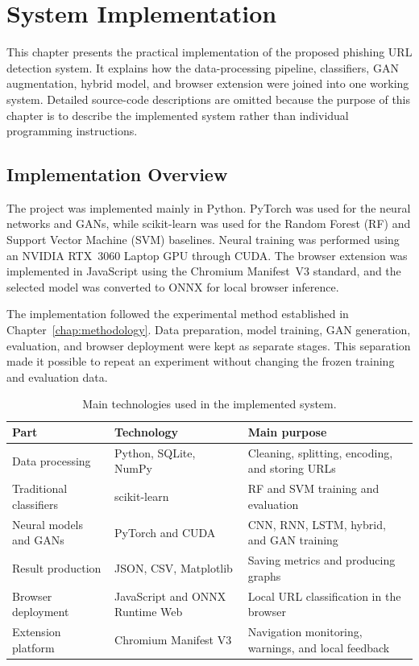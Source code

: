 \chapter{System Implementation}
\label{chap:implementation}

This chapter presents the practical implementation of the proposed phishing
URL detection system. It explains how the data-processing pipeline,
classifiers, GAN augmentation, hybrid model, and browser extension were joined
into one working system. Detailed source-code descriptions are omitted because
the purpose of this chapter is to describe the implemented system rather than
individual programming instructions.

\section{Implementation Overview}

The project was implemented mainly in Python. PyTorch was used for the neural
networks and GANs, while scikit-learn was used for the Random Forest (RF) and
Support Vector Machine (SVM) baselines. Neural training was performed using an
NVIDIA RTX~3060 Laptop GPU through CUDA. The browser extension was implemented
in JavaScript using the Chromium Manifest~V3 standard, and the selected model
was converted to ONNX for local browser inference.

The implementation followed the experimental method established in
Chapter~\ref{chap:methodology}. Data preparation, model training, GAN
generation, evaluation, and browser deployment were kept as separate stages.
This separation made it possible to repeat an experiment without changing the
frozen training and evaluation data.

\begin{table}[htbp]
\centering
\caption{Main technologies used in the implemented system.}
\label{tab:implementation-software}
\small
\begin{tabular}{@{}p{}p{}p{}@{}}
\toprule
Part & Technology & Main purpose \\
\midrule
Data processing & Python, SQLite, NumPy & Cleaning, splitting, encoding, and storing URLs \\
Traditional classifiers & scikit-learn & RF and SVM training and evaluation \\
Neural models and GANs & PyTorch and CUDA & CNN, RNN, LSTM, hybrid, and GAN training \\
Result production & JSON, CSV, Matplotlib & Saving metrics and producing graphs \\
Browser deployment & JavaScript and ONNX Runtime Web & Local URL classification in the browser \\
Extension platform & Chromium Manifest V3 & Navigation monitoring, warnings, and local feedback \\
\bottomrule
\end{tabular}
\end{table}

